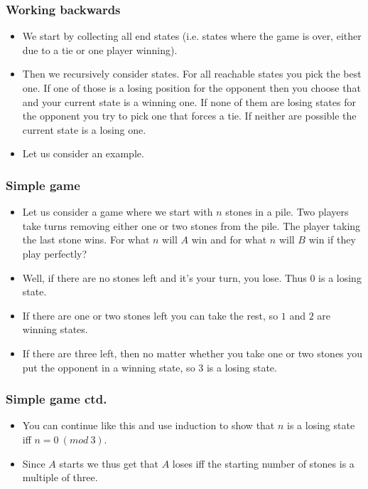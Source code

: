 \documentclass{beamer}
\begin{document}
\begin{frame}[plain]
    \frametitle{Working backwards}

\begin{itemize}

\item We start by collecting all end states (i.e. states where the game is over, either due to a tie or one player winning).
\item Then we recursively consider states. For all reachable states you pick the best one. If one of those is a losing position for the opponent then you choose that and your current state is a winning one. If none of them are losing states for the opponent you try to pick one that forces a tie. If neither are possible the current state is a losing one.

\item Let us consider an example.

\end{itemize}

\end{frame}

\begin{frame}[plain]
    \frametitle{Simple game}

\begin{itemize}

\item Let us consider a game where we start with $n$ stones in a pile. Two players take turns removing either one or two stones from the pile. The player taking the last stone wins. For what $n$ will $A$ win and for what $n$ will $B$ win if they play perfectly?

\item Well, if there are no stones left and it's your turn, you lose. Thus $0$ is a losing state.

\item If there are one or two stones left you can take the rest, so $1$ and $2$ are winning states.

\item If there are three left, then no matter whether you take one or two stones you put the opponent in a winning state, so $3$ is a losing state.

\end{itemize}

\end{frame}

\begin{frame}[plain]
    \frametitle{Simple game ctd.}

\begin{itemize}

\item You can continue like this and use induction to show that $n$ is a losing state iff $n = 0 \ (mod \ 3)$.

\item Since $A$ starts we thus get that $A$ loses iff the starting number of stones is a multiple of three.

\end{itemize}

\end{frame}
\end{document}
